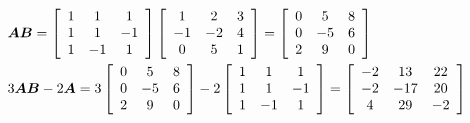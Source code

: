 \documentclass{ctexart}
\begin{document}
\begin{problem}\

\begin{align*}
     & \boldsymbol{A}\boldsymbol{B}           =
    \left[\begin{array}{ccc}
                  1 & 1  & 1  \\
                  1 & 1  & -1 \\
                  1 & -1 & 1
              \end{array}\right]
    \left[\begin{array}{ccc}
                  1  & 2  & 3 \\
                  -1 & -2 & 4 \\
                  0  & 5  & 1
              \end{array}\right]=
    \left[\begin{array}{ccc}
                  0 & 5  & 8 \\
                  0 & -5 & 6 \\
                  2 & 9  & 0
              \end{array}\right]  \\
     & 3\boldsymbol{A}\boldsymbol{B}-2 \boldsymbol{A}  =
    3\left[\begin{array}{ccc}
                   0 & 5  & 8 \\
                   0 & -5 & 6 \\
                   2 & 9  & 0
               \end{array}\right]
    -2\left[\begin{array}{ccc}
                    1 & 1  & 1  \\
                    1 & 1  & -1 \\
                    1 & -1 & 1
                \end{array}\right]
    =\left[\begin{array}{ccc}
                   -2 & 13  & 22 \\
                   -2 & -17 & 20 \\
                   4  & 29  & -2
               \end{array}\right]
\end{align*}
\end{problem}
\end{document}
